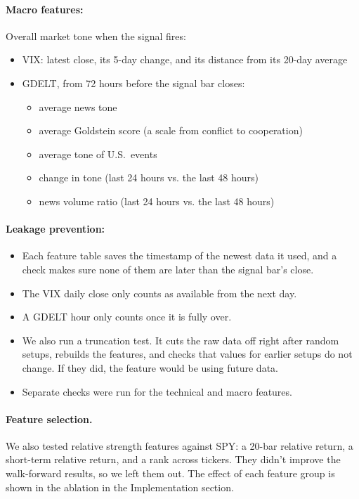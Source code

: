 \documentclass[11pt]{article}
\begin{document}
\paragraph{Macro features:} Overall market tone when the signal fires:
\begin{itemize}
  \item VIX: latest close, its 5-day change, and its distance from its 20-day average
  \item GDELT, from 72 hours before the signal bar closes:
  \begin{itemize}
    \item average news tone
    \item average Goldstein score (a scale from conflict to cooperation)
    \item average tone of U.S.\ events
    \item change in tone (last 24 hours vs. the last 48 hours)
    \item news volume ratio (last 24 hours vs. the last 48 hours)
  \end{itemize}
\end{itemize}
 
\paragraph{Leakage prevention:} 
\begin{itemize}
  \item Each feature table saves the timestamp of the newest data it used, and a check makes sure none of them are later than the signal bar's close.
  \item The VIX daily close only counts as available from the next day.
  \item A GDELT hour only counts once it is fully over.
  \item We also run a truncation test. It cuts the raw data off right after random setups, rebuilds the features, and checks that values for earlier setups do not change. If they did, the feature would be using future data.
  \item Separate checks were run for the technical and macro features.
\end{itemize}
 
\paragraph{Feature selection.} We also tested relative strength features against SPY: a 20-bar relative return, a short-term relative return, and a rank across tickers. They didn't improve the walk-forward results, so we left them out. The effect of each feature group is shown in the ablation in the Implementation section.
\end{document}
